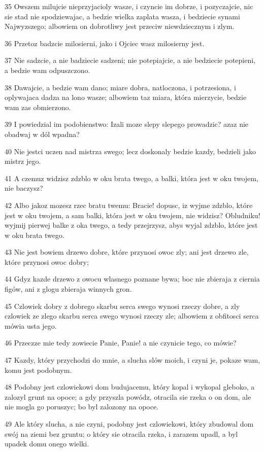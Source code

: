 \par 35 Owszem milujcie nieprzyjacioly wasze, i czyncie im dobrze, i pozyczajcie, nic sie stad nie spodziewajac, a bedzie wielka zaplata wasza, i bedziecie synami Najwyzszego; albowiem on dobrotliwy jest przeciw niewdziecznym i zlym.
\par 36 Przetoz badzcie milosierni, jako i Ojciec wasz milosierny jest.
\par 37 Nie sadzcie, a nie badziecie sadzeni; nie potepiajcie, a nie bedziecie potepieni, a bedzie wam odpuszczono.
\par 38 Dawajcie, a bedzie wam dano; miare dobra, natloczona, i potrzesiona, i oplywajaca dadza na lono wasze; albowiem taz miara, która mierzycie, bedzie wam zas obmierzono.
\par 39 I powiedzial im podobienstwo: Izali moze slepy slepego prowadzic? azaz nie obadwaj w dól wpadna?
\par 40 Nie jestci uczen nad mistrza swego; lecz doskonaly bedzie kazdy, bedzieli jako mistrz jego.
\par 41 A czemuz widzisz zdzblo w oku brata twego, a balki, która jest w oku twojem, nie baczysz?
\par 42 Albo jakoz mozesz rzec bratu twemu: Bracie! dopusc, iz wyjme zdzblo, które jest w oku twojem, a sam balki, która jest w oku twojem, nie widzisz? Obludniku! wyjmij pierwej balke z oka twego, a tedy przejrzysz, abys wyjal zdzblo, które jest w oku brata twego.
\par 43 Nie jest bowiem drzewo dobre, które przynosi owoc zly; ani jest drzewo zle, które przynosi owoc dobry;
\par 44 Gdyz kazde drzewo z owocu wlasnego poznane bywa; boc nie zbieraja z ciernia figów, ani z glogu zbieraja winnych gron.
\par 45 Czlowiek dobry z dobrego skarbu serca swego wynosi rzeczy dobre, a zly czlowiek ze zlego skarbu serca swego wynosi rzeczy zle; albowiem z obfitosci serca mówia usta jego.
\par 46 Przeczze mie tedy zowiecie Panie, Panie! a nie czynicie tego, co mówie?
\par 47 Kazdy, który przychodzi do mnie, a slucha slów moich, i czyni je, pokaze wam, komu jest podobnym.
\par 48 Podobny jest czlowiekowi dom budujacemu, który kopal i wykopal gleboko, a zalozyl grunt na opoce; a gdy przyszla powódz, otracila sie rzeka o on dom, ale nie mogla go poruszyc; bo byl zalozony na opoce.
\par 49 Ale który slucha, a nie czyni, podobny jest czlowiekowi, który zbudowal dom swój na ziemi bez gruntu; o który sie otracila rzeka, i zarazem upadl, a byl upadek domu onego wielki.

